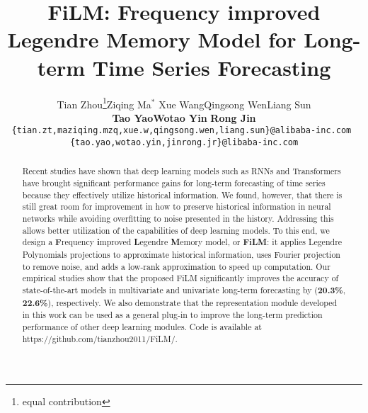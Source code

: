 \documentclass{article}
\title{FiLM: Frequency improved Legendre Memory Model for Long-term
Time Series Forecasting}
\author{Tian Zhou\thanks{equal contribution}\quad Ziqing Ma$^*$ \quad  Xue Wang\quad Qingsong Wen\quad  Liang Sun \\ \textbf{Tao Yao}\quad \textbf{Wotao Yin} \quad  \textbf{Rong Jin} \\
\texttt{\{tian.zt,maziqing.mzq,xue.w,qingsong.wen,liang.sun\}@alibaba-inc.com }\\
\texttt{\{tao.yao,wotao.yin,jinrong.jr\}@libaba-inc.com}\\
}
\begin{document}
\maketitle


\begin{abstract}


Recent studies have shown that deep learning models such as RNNs and Transformers have brought significant performance gains for long-term forecasting of time series because they effectively utilize historical information. We found, however, that there is still great room for improvement in how to preserve historical information in neural networks while avoiding overfitting to noise presented in the history. Addressing this allows better utilization of the capabilities of deep learning models. To this end, we design a \textbf{F}requency \textbf{i}mproved \textbf{L}egendre \textbf{M}emory model, or {\bf FiLM}: it applies Legendre Polynomials projections to approximate historical information, uses Fourier projection to remove noise, and adds a low-rank approximation to speed up computation. Our empirical studies show that the proposed FiLM significantly improves the accuracy of state-of-the-art models in multivariate and univariate long-term forecasting by (\textbf{20.3\%}, \textbf{22.6\%}), respectively. We also demonstrate that the representation module developed in this work can be used as a general plug-in to improve the long-term prediction performance of other deep learning modules. Code is available at https://github.com/tianzhou2011/FiLM/.


  
\end{abstract}
\end{document}
